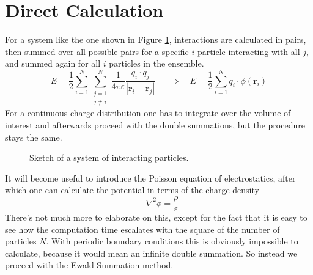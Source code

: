 \documentclass[a4paper, 12pt, notitlepage]{article}
\begin{document}
\section{Direct Calculation}\label{sec:DC}
For a system like the one shown in Figure \ref{fig:fig_omega}, interactions are calculated in pairs, then summed over all possible pairs for a specific $i$ particle interacting with all $j$, and summed again for all $i$ particles in the ensemble.
\begin{equation}
E = \frac{1}{2}\sum_{i = 1}^{N}\sum_{\substack{j=1\\j\neq i}}^{N}\frac{1}{4\pi\varepsilon}\frac{q_i\cdot q_j}{|\mathbf{r}_i - \mathbf{r}_j|}\quad \implies \quad E = \frac{1}{2}\sum_{i=1}^{N}q_i\cdot\phi(\mathbf{r}_i)\label{eq:eq1}
\end{equation}
For a continuous charge distribution one has to integrate over the volume of interest and afterwards proceed with the double summations, but the procedure stays the same.
\begin{figure}
	\centering
	\vspace{100pt}
	
	\caption{Sketch of a system of interacting particles.}\label{fig:fig_omega}
\end{figure}
It will become useful to introduce the Poisson equation of electrostatics, after which one can calculate the potential in terms of the charge density
\begin{equation}
	-\nabla^2\phi = \frac{\rho}{\varepsilon}\label{eq:eq2}
\end{equation}
There's not much more to elaborate on this, except for the fact that it is easy to see how the computation time escalates with the square of the number of particles $N$. With periodic boundary conditions this is obviously impossible to calculate, because it would mean an infinite double summation. So instead we proceed with the Ewald Summation method.
\end{document}
